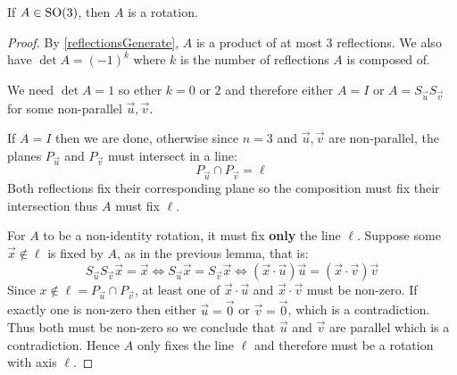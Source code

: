 \documentclass[../main.tex]{subfiles}
\begin{document}
\begin{lemma}[Elements of $\SO(3)$]
  If $A \in \mathrm{SO}(3)$, then $A$ is a rotation.
\end{lemma}
\begin{proof}
  By \cref{reflectionsGenerate}, $A$ is a product of at most 3 reflections.
  We also have $\det A = (-1)^{k}$ where $k$ is the number of reflections $A$ is composed of.

  We need $\det A = 1$ so ether $k = 0 \text{ or } 2$ and therefore either $A = I$ or $A = S_{\vec{u}}S_{\vec{v}}$ for some non-parallel $\vec{u}, \vec{v}$.

  If $A = I$ then we are done, otherwise since $n = 3$ and $\vec{u}, \vec{v}$ are non-parallel, the planes $P_{\vec{u}}$ and $P_{\vec{v}}$ must intersect in a line:
  \[
    P_{\vec{u}} \cap P_{\vec{v}} = \ell
  \]
  Both reflections fix their corresponding plane so the composition must fix their intersection thus $A$ must fix $\ell$.

  For $A$ to be a non-identity rotation, it must fix \textbf{only} the line $\ell$.
  Suppose some $\vec{x} \notin \ell$ is fixed by $A$, as in the previous lemma, that is:
  \[
    S_{\vec{u}}S_{\vec{v}}\vec{x} = \vec{x} \iff S_{\vec{u}} \vec{x} = S_{\vec{v}}\vec{x} \iff (\vec{x} \cdot \vec{u})\vec{u} = (\vec{x} \cdot \vec{v})\vec{v}
  \]
  Since $x \notin \ell = P_{\vec{u}} \cap P_{\vec{v}}$, at least one of $\vec{x} \cdot \vec{u}$ and $\vec{x} \cdot \vec{v}$ must be non-zero.
  If exactly one is non-zero then either $\vec{u} = \vec{0}$ or $\vec{v} = \vec{0}$, which is a contradiction.
  Thus both must be non-zero so we conclude that $\vec{u}$ and $\vec{v}$ are parallel which is a contradiction.
  Hence $A$ only fixes the line $\ell$ and therefore must be a rotation with axis $\ell$.
\end{proof}
\end{document}
